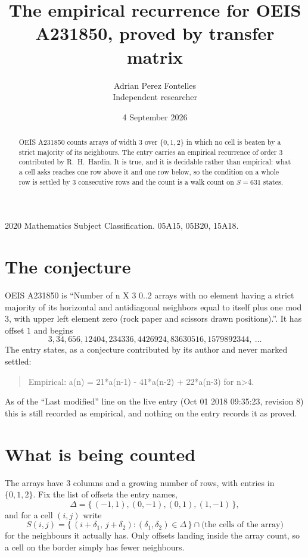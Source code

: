 \documentclass[11pt,a4paper]{article}
\title{The empirical recurrence for OEIS A231850, proved by transfer matrix}
\author{Adrian Perez Fontelles\\ \small Independent researcher}
\date{4 September 2026}
\theoremstyle{plain}
\theoremstyle{definition}
\begin{document}
\maketitle

\begin{abstract}
OEIS A231850 counts arrays of width $3$ over $\{0,1,2\}$ in which no cell is beaten by a strict majority of its neighbours. The entry carries an
empirical recurrence of order $3$ contributed by R.~H.~Hardin. It is true, and it is
decidable rather than empirical: what a cell asks reaches one row above
it and one row below, so the condition on a whole row is settled by
$3$ consecutive rows and the count is a walk count on $S=631$ states.
\end{abstract}

\noindent\small 2020 Mathematics Subject Classification. 05A15, 05B20, 15A18.\normalsize

\section{The conjecture}

OEIS A231850 is ``Number of n X 3 0..2 arrays with no element having a strict majority of its horizontal and antidiagonal neighbors equal to itself plus one mod 3, with upper left element zero (rock paper and scissors drawn positions).''. It has offset $1$ and begins
\[
3, 34, 656, 12404, 234336, 4426924, 83630516, 1579892344,\ \dots
\]
The entry states, as a conjecture contributed by its author and never marked settled:
\begin{quote}
Empirical: a(n) = 21*a(n-1) - 41*a(n-2) + 22*a(n-3) for n>4.
\end{quote}
As of the ``Last modified'' line on the live entry (Oct 01 2018 09:35:23, revision 8) this is still
recorded as empirical, and nothing on the entry records it as proved.

\section{What is being counted}

The arrays have $3$ columns and a growing number of rows, with entries in $\{0,1,2\}$. Fix the
list of offsets the entry names,
\[
\Delta=\{\,(-1,1), (0,-1), (0,1), (1,-1)\,\},
\]
and for a cell $(i,j)$ write
\[
S(i,j)=\{\,(i+\delta_1,\,j+\delta_2) : (\delta_1,\delta_2)\in\Delta\,\}\cap
\text{(the cells of the array)}
\]
for the neighbours it actually has. Only offsets landing inside the array count, so a cell on
the border simply has fewer neighbours.
\end{document}
